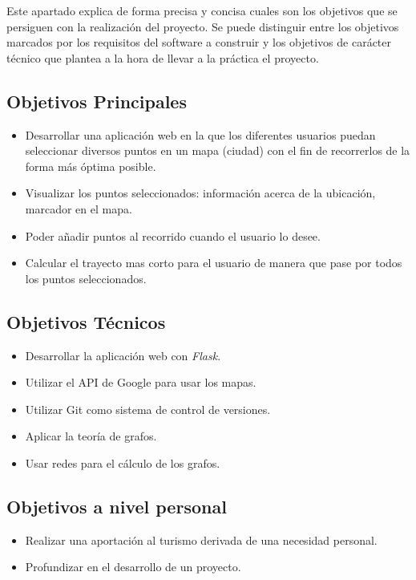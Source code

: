 
Este apartado explica de forma precisa y concisa cuales son los objetivos que se persiguen con la realización del proyecto. Se puede distinguir entre los objetivos marcados por los requisitos del software a construir y los objetivos de carácter técnico que plantea a la hora de llevar a la práctica el proyecto.

\subsection{Objetivos Principales}

\begin{itemize}
	\item Desarrollar una aplicación web en la que los diferentes usuarios puedan seleccionar diversos puntos en un mapa (ciudad) con el fin de recorrerlos de la forma más óptima posible.
	\item Visualizar los puntos seleccionados: información acerca de la ubicación, marcador en el mapa.
	\item Poder añadir puntos al recorrido cuando el usuario lo desee.
	\item Calcular el trayecto mas corto para el usuario de manera que pase por todos los puntos seleccionados.
\end{itemize}

\subsection{Objetivos Técnicos}
\begin{itemize}
	\item Desarrollar la aplicación web con \textit{Flask}.
	\item Utilizar el API de Google para usar los mapas.
	\item Utilizar Git como sistema de control de versiones.
	\item Aplicar la teoría de grafos.
	\item Usar redes para el cálculo de los grafos.
\end{itemize}
\subsection{Objetivos a nivel personal}
\begin{itemize}
	\item Realizar una aportación al turismo derivada de una necesidad personal.
	\item Profundizar en el desarrollo de un proyecto.
\end{itemize}
